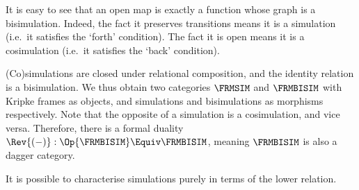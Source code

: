 \documentclass[a4paper,UKenglish,cleveref, autoref]{lipics-v2021}
\begin{document}
It is easy to see that an open map is exactly a function whose graph is a
bisimulation. Indeed, the fact it preserves transitions means it is a simulation
(i.e.\ it satisfies the `forth' condition). The fact it is open means it is a
cosimulation (i.e.\ it satisfies the `back' condition).

(Co)simulations are closed under relational composition, and the identity
relation is a bisimulation. We thus obtain two categories \(\FRMSIM\) and
\(\FRMBISIM\) with Kripke frames as objects, and simulations and bisimulations
as morphisms respectively. Note that the opposite of a simulation is a
cosimulation, and vice versa. Therefore, there is a formal duality \(\Rev{(-)} :
\Op{\FRMBISIM} \Equiv \FRMBISIM\), meaning \(\FRMBISIM\) is also a dagger
category.

It is possible to characterise simulations purely in terms of the lower
relation.
\end{document}

